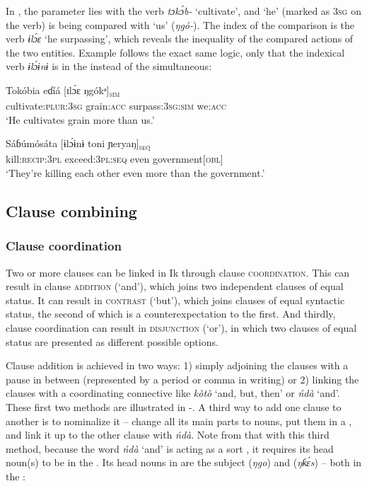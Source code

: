 In , the parameter lies with the verb \textit{tɔk\'{ɔ}b-} ‘cultivate’, and ‘he’ (marked as 3\textsc{sg} on the verb) is being compared with ‘us’ (\textit{ŋgó-}). The index of the comparison is the verb \textit{ɨl\'{ɔ}{\Í}ɛ} ‘he surpassing’, which reveals the inequality of the compared actions of the two entities. Example  follows the exact same logic, only that the indexical verb \textit{ɨl\'{ɔ}ɨnɨ} is in the  instead of the simultaneous: 



\ea\label{ex:syn:59}
\gll Tokóbia     eɗíá        [ɪl\'{ɔ}{\Í}ɛ     ŋgókᵃ]\textsc{\textsubscript{sim}} \\
cultivate:\textsc{plur:3sg} grain:\textsc{acc} surpass:\textsc{3sg:sim} we:\textsc{acc}    \\
\glt ‘He cultivates grain more than us.’ 
\z




\ea\label{ex:syn:60}
\gll Sáɓúmósáta     [ɨl\'{ɔ}ɨnɨ          toni  ɲeryaŋ]\textsc{\textsubscript{seq}} \\
kill:\textsc{recip:3pl} exceed:\textsc{3pl:seq} even government[\textsc{obl}]    \\
\glt ‘They’re killing each other even more than the government.’ 
\z






\subsection{Clause combining}\label{sec:10.8}
\subsubsection{Clause coordination}\label{sec:10.8.1}

Two or more clauses can be linked in Ik through clause \textsc{coordination}. This can result in clause \textsc{addition} (‘and’), which joins two independent clauses of equal status. It can result in \textsc{contrast} (‘but’), which joins clauses of equal syntactic status, the second of which is a counterexpectation to the first. And thirdly, clause coordination can result in \textsc{disjunction} (‘or’), in which two clauses of equal status are presented as different possible options.

Clause addition is achieved in two ways: 1) simply adjoining the clauses with a pause in between (represented by a period or comma in writing) or 2) linking the clauses with a coordinating connective like \textit{kòtò} ‘and, but, then’ or \textit{ńdà} ‘and’. These first two methods are illustrated in -. A third way to add one clause to another is to nominalize it – change all its main parts to nouns, put them in a , and link it up to the other clause with \textit{ńdà}. Note from  that with this third method, because the word \textit{ńdà} ‘and’ is acting as a sort , it requires its head noun(s) to be in the . Its head nouns in  are the subject (\textit{ŋgo}) and  (\textit{ŋƙ\'{ɛ}s{\Í}}) – both in the :




